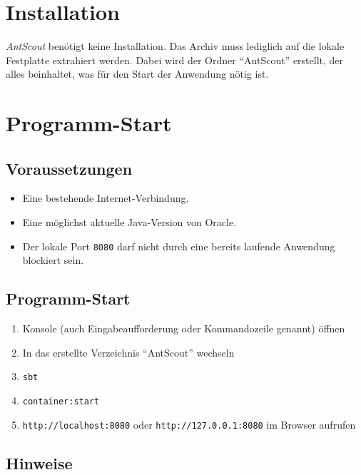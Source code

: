 \documentclass[
  a4paper,
  10pt
]{scrreprt}
\begin{document}
\section{Installation}
\label{sec:installation}

\textit{AntScout} benötigt keine Installation.
Das Archiv muss lediglich auf die lokale Festplatte extrahiert werden.
Dabei wird der Ordner ``AntScout'' erstellt, der alles beinhaltet, was für den Start der Anwendung nötig ist.

\section{Programm-Start}
\label{sec:programmstart}

\subsection{Voraussetzungen}
\label{sec:voraussetzungen}

\begin{itemize}
  \item Eine bestehende Internet-Verbindung.
  \item Eine möglichst aktuelle Java-Version von Oracle.
  \item Der lokale Port \texttt{8080} darf nicht durch eine bereits laufende Anwendung blockiert sein.
\end{itemize}

\subsection{Programm-Start}
\label{sec:programm-start}

\begin{enumerate}
  \item Konsole (auch Eingabeaufforderung oder Kommandozeile genannt) öffnen
  \item In das erstellte Verzeichnis ``AntScout'' wechseln
  \item \texttt{sbt}
  \item \texttt{container:start}
  \item \texttt{http://localhost:8080} oder \texttt{http://127.0.0.1:8080} im Browser aufrufen
\end{enumerate}

\subsection{Hinweise}
\label{sec:programmstart-hinweise}
\end{document}
